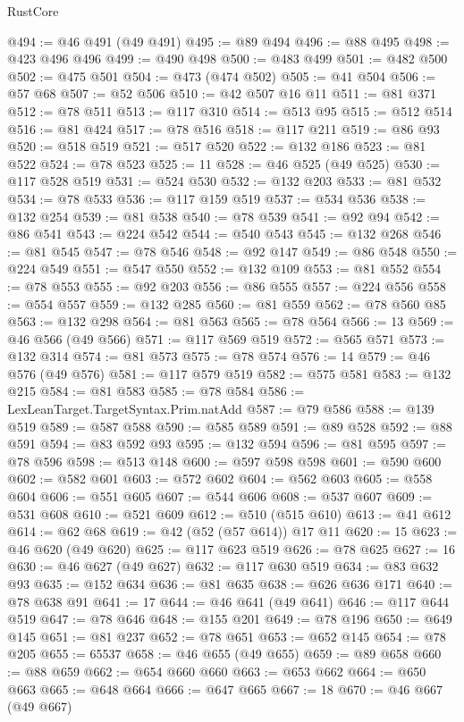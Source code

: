 \begin{lexlean}{RustCore}
\begin{coremodule}
@494 := @46 @491 (@49 @491)
@495 := @89 @494
@496 := @88 @495
@498 := @423 @496 @496
@499 := @490 @498
@500 := @483 @499
@501 := @482 @500
@502 := @475 @501
@504 := @473 (@474 @502)
@505 := @41 @504
@506 := @57 @68
@507 := @52 @506
@510 := @42 @507 @16 @11
@511 := @81 @371
@512 := @78 @511
@513 := @117 @310
@514 := @513 @95
@515 := @512 @514
@516 := @81 @424
@517 := @78 @516
@518 := @117 @211
@519 := @86 @93
@520 := @518 @519
@521 := @517 @520
@522 := @132 @186
@523 := @81 @522
@524 := @78 @523
@525 := 11
@528 := @46 @525 (@49 @525)
@530 := @117 @528 @519
@531 := @524 @530
@532 := @132 @203
@533 := @81 @532
@534 := @78 @533
@536 := @117 @159 @519
@537 := @534 @536
@538 := @132 @254
@539 := @81 @538
@540 := @78 @539
@541 := @92 @94
@542 := @86 @541
@543 := @224 @542
@544 := @540 @543
@545 := @132 @268
@546 := @81 @545
@547 := @78 @546
@548 := @92 @147
@549 := @86 @548
@550 := @224 @549
@551 := @547 @550
@552 := @132 @109
@553 := @81 @552
@554 := @78 @553
@555 := @92 @203
@556 := @86 @555
@557 := @224 @556
@558 := @554 @557
@559 := @132 @285
@560 := @81 @559
@562 := @78 @560 @85
@563 := @132 @298
@564 := @81 @563
@565 := @78 @564
@566 := 13
@569 := @46 @566 (@49 @566)
@571 := @117 @569 @519
@572 := @565 @571
@573 := @132 @314
@574 := @81 @573
@575 := @78 @574
@576 := 14
@579 := @46 @576 (@49 @576)
@581 := @117 @579 @519
@582 := @575 @581
@583 := @132 @215
@584 := @81 @583
@585 := @78 @584
@586 := LexLeanTarget.TargetSyntax.Prim.natAdd
@587 := @79 @586
@588 := @139 @519
@589 := @587 @588
@590 := @585 @589
@591 := @89 @528
@592 := @88 @591
@594 := @83 @592 @93
@595 := @132 @594
@596 := @81 @595
@597 := @78 @596
@598 := @513 @148
@600 := @597 @598 @598
@601 := @590 @600
@602 := @582 @601
@603 := @572 @602
@604 := @562 @603
@605 := @558 @604
@606 := @551 @605
@607 := @544 @606
@608 := @537 @607
@609 := @531 @608
@610 := @521 @609
@612 := @510 (@515 @610)
@613 := @41 @612
@614 := @62 @68
@619 := @42 (@52 (@57 @614)) @17 @11
@620 := 15
@623 := @46 @620 (@49 @620)
@625 := @117 @623 @519
@626 := @78 @625
@627 := 16
@630 := @46 @627 (@49 @627)
@632 := @117 @630 @519
@634 := @83 @632 @93
@635 := @152 @634
@636 := @81 @635
@638 := @626 @636 @171
@640 := @78 @638 @91
@641 := 17
@644 := @46 @641 (@49 @641)
@646 := @117 @644 @519
@647 := @78 @646
@648 := @155 @201
@649 := @78 @196
@650 := @649 @145
@651 := @81 @237
@652 := @78 @651
@653 := @652 @145
@654 := @78 @205
@655 := 65537
@658 := @46 @655 (@49 @655)
@659 := @89 @658
@660 := @88 @659
@662 := @654 @660 @660
@663 := @653 @662
@664 := @650 @663
@665 := @648 @664
@666 := @647 @665
@667 := 18
@670 := @46 @667 (@49 @667)

\end{coremodule}
\end{lexlean}
